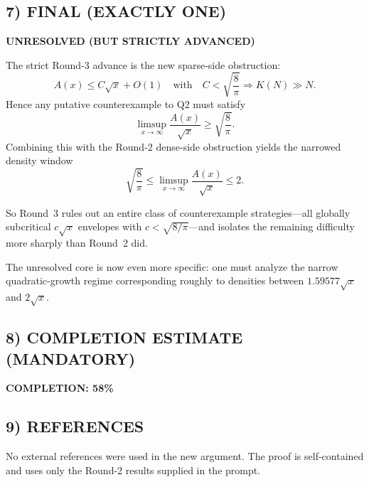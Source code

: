\subsection*{7) FINAL (EXACTLY ONE)}
\textbf{UNRESOLVED (BUT STRICTLY ADVANCED)}

The strict Round-3 advance is the new sparse-side obstruction:
\[
A(x)\le C\sqrt x+O(1)
\quad\mbox{with}\quad
C<\sqrt{\frac{8}{\pi}}
\Longrightarrow
K(N)\gg N.
\]
Hence any putative counterexample to Q2 must satisfy
\[
\limsup_{x\to\infty}\frac{A(x)}{\sqrt x}
\ge
\sqrt{\frac{8}{\pi}}.
\]
Combining this with the Round-2 dense-side obstruction yields the narrowed density window
\[
\sqrt{\frac{8}{\pi}}
\le
\limsup_{x\to\infty}\frac{A(x)}{\sqrt x}
\le 2.
\]

So Round~3 rules out an entire class of counterexample strategies---all globally subcritical $c\sqrt x$ envelopes with $c<\sqrt{8/\pi}$---and isolates the remaining difficulty more sharply than Round~2 did.

The unresolved core is now even more specific: one must analyze the narrow quadratic-growth regime corresponding roughly to densities between $1.59577\sqrt x$ and $2\sqrt x$.

\subsection*{8) COMPLETION ESTIMATE (MANDATORY)}
\textbf{COMPLETION: 58\%}

\subsection*{9) REFERENCES}
No external references were used in the new argument. The proof is self-contained and uses only the Round-2 results supplied in the prompt.
